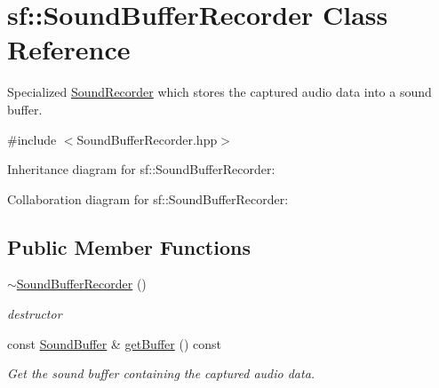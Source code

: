 \hypertarget{classsf_1_1_sound_buffer_recorder}{}\section{sf\+:\+:Sound\+Buffer\+Recorder Class Reference}
\label{classsf_1_1_sound_buffer_recorder}


Specialized \hyperlink{classsf_1_1_sound_recorder}{Sound\+Recorder} which stores the captured audio data into a sound buffer.  




{\ttfamily \#include $<$Sound\+Buffer\+Recorder.\+hpp$>$}



Inheritance diagram for sf\+:\+:Sound\+Buffer\+Recorder\+:


Collaboration diagram for sf\+:\+:Sound\+Buffer\+Recorder\+:
\subsection*{Public Member Functions}
\begin{DoxyCompactItemize}
\item 
\mbox{\label{classsf_1_1_sound_buffer_recorder_a350f7f885ccfd12b4c6c120c23695637}} 
\hyperlink{classsf_1_1_sound_buffer_recorder_a350f7f885ccfd12b4c6c120c23695637}{$\sim$\+Sound\+Buffer\+Recorder} ()
\begin{DoxyCompactList}\small\item\em destructor \end{DoxyCompactList}\item 
const \hyperlink{classsf_1_1_sound_buffer}{Sound\+Buffer} \& \hyperlink{classsf_1_1_sound_buffer_recorder_aa3a8d7a612cb885ed2f58bb86aa24acb}{get\+Buffer} () const
\begin{DoxyCompactList}\small\item\em Get the sound buffer containing the captured audio data. \end{DoxyCompactList}\end{DoxyCompactItemize}
